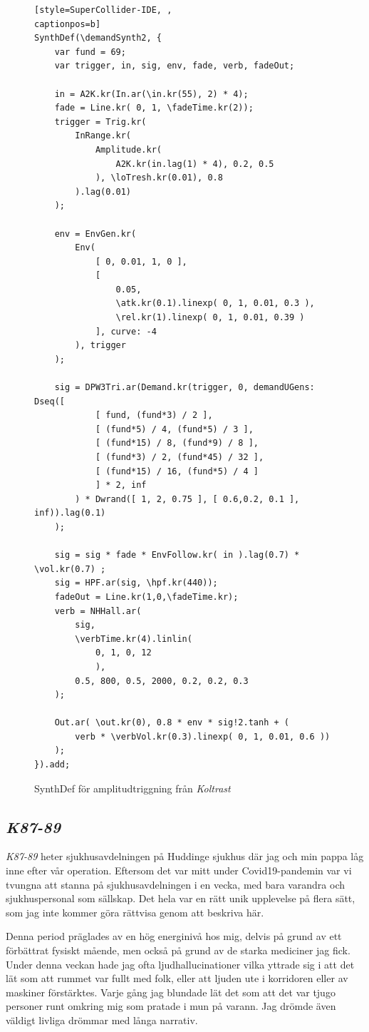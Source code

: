 \documentclass{article}
\renewcommand{\baselinestretch}{1.5}
\begin{document}
\renewcommand{\baselinestretch}{1}
\begin{figure}
\begin{lstlisting}[style=SuperCollider-IDE, ,
captionpos=b]
SynthDef(\demandSynth2, {
	var fund = 69;
	var trigger, in, sig, env, fade, verb, fadeOut;

	in = A2K.kr(In.ar(\in.kr(55), 2) * 4);
	fade = Line.kr( 0, 1, \fadeTime.kr(2));
	trigger = Trig.kr(
		InRange.kr( 
			Amplitude.kr(
				A2K.kr(in.lag(1) * 4), 0.2, 0.5
			), \loTresh.kr(0.01), 0.8 
		).lag(0.01)
	);

	env = EnvGen.kr(
		Env( 
			[ 0, 0.01, 1, 0 ],
			[
				0.05,
				\atk.kr(0.1).linexp( 0, 1, 0.01, 0.3 ),
				\rel.kr(1).linexp( 0, 1, 0.01, 0.39 ) 
			], curve: -4
		), trigger
	);

	sig = DPW3Tri.ar(Demand.kr(trigger, 0, demandUGens: Dseq([ 
			[ fund, (fund*3) / 2 ], 
			[ (fund*5) / 4, (fund*5) / 3 ], 
			[ (fund*15) / 8, (fund*9) / 8 ], 
			[ (fund*3) / 2, (fund*45) / 32 ],  
			[ (fund*15) / 16, (fund*5) / 4 ]
			] * 2, inf
		) * Dwrand([ 1, 2, 0.75 ], [ 0.6,0.2, 0.1 ], inf)).lag(0.1)
	);

	sig = sig * fade * EnvFollow.kr( in ).lag(0.7) * \vol.kr(0.7) ;
	sig = HPF.ar(sig, \hpf.kr(440));
	fadeOut = Line.kr(1,0,\fadeTime.kr);
	verb = NHHall.ar(
		sig, 
		\verbTime.kr(4).linlin(
			0, 1, 0, 12
			), 
		0.5, 800, 0.5, 2000, 0.2, 0.2, 0.3
	);

	Out.ar( \out.kr(0), 0.8 * env * sig!2.tanh + ( 
		verb * \verbVol.kr(0.3).linexp( 0, 1, 0.01, 0.6 ))
	);  
}).add;
\end{lstlisting}
\caption{SynthDef för amplitudtriggning från \emph{Koltrast}}
\end{figure}
\renewcommand{\baselinestretch}{1.5}


\subsection{\emph{K87-89}}\nocite{K87-89}
\emph{K87-89} heter sjukhusavdelningen på Huddinge sjukhus där jag och min pappa låg inne efter vår operation. 
Eftersom det var mitt under Covid19-pandemin var vi tvungna att stanna på sjukhusavdelningen i en vecka, med bara
varandra och sjukhuspersonal som sällskap. Det hela var en rätt unik upplevelse på flera sätt, som jag inte
kommer göra rättvisa genom att beskriva här. 

Denna period präglades av en hög energinivå hos mig, delvis på grund av ett förbättrat fysiskt mående, men
också på grund av de starka mediciner jag fick. Under denna veckan hade jag ofta ljudhallucinationer vilka
yttrade sig i att det lät som att rummet var fullt med folk, eller att ljuden ute i korridoren eller av
maskiner förstärktes. Varje gång jag blundade lät det som att det var tjugo personer runt omkring mig som
pratade i mun på varann. Jag drömde även väldigt livliga drömmar med långa narrativ. 
\end{document}
